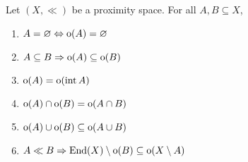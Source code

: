 \begin{proposition}
	Let \( (X,\ll) \) be a proximity space.  For all \( A,B \subseteq X \),
	\begin{enumerate}[label={(\arabic*)},ref={\theproposition(\arabic*)}]
		\item \label{oempty}
			\( A = \varnothing \Leftrightarrow \operatorname{o}(A) = \varnothing \)
		\item \label{osubset}
			\( A \subseteq B \Rightarrow \operatorname{o}(A) \subseteq \operatorname{o}(B) \)
		\item \label{ointerior}
			\( \operatorname{o}(A) = \operatorname{o}(\operatorname{int}{A}) \)
		\item \label{oint}
			\( \operatorname{o}(A) \cap \operatorname{o}(B) = \operatorname{o}(A \cap B) \)
		\item \label{oun}
			\( \operatorname{o}(A) \cup \operatorname{o}(B) \subseteq \operatorname{o}(A \cup B) \)
		\item \label{llo}
			\( A \ll B \Rightarrow \operatorname{End}(X) \setminus \operatorname{o}(B) \subseteq \operatorname{o}(X \setminus A) \)
	\end{enumerate}
\end{proposition}
